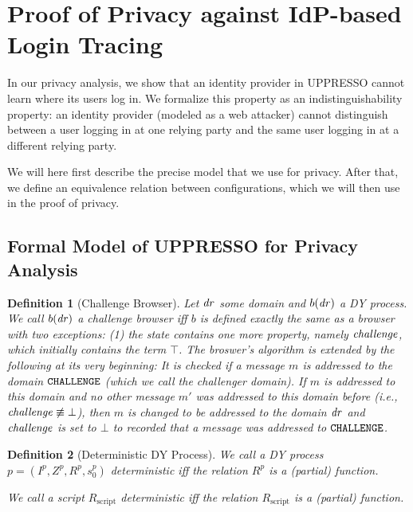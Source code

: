 \documentclass[letterpaper,onecolumn,10pt]{article}
\newtheorem{definition}{Definition}
\begin{document}
\section{Proof of Privacy against IdP-based Login Tracing}

In our privacy analysis, we show that an identity provider in UPPRESSO cannot learn 
where its users log in. We formalize this property as an indistinguishability 
property: an identity provider (modeled as a web attacker) cannot distinguish 
between a user logging in at one relying party and the same user logging in at 
a different relying party.

We will here first describe the precise model that we use for privacy.
After that, we define an equivalence relation between configurations,
which we will then use in the proof of privacy.

\subsection{Formal Model of UPPRESSO for Privacy Analysis}

\begin{definition}[Challenge Browser]
  Let $\mathit{dr}$ some domain and $b(\mathit{dr})$ a DY process. We call $b(\mathit{dr})$ a \emph{challenge browser} iff $b$
  is defined exactly the same as a browser with two exceptions: (1) the
  state contains one more property, namely $\mathit{challenge}$, which  initially 
  contains the term $\top$. The broswer's algorithm is extended by the following 
  at its very beginning: It is checked if a message $m$ is addressed to the domain
  $\mathtt{CHALLENGE}$ (which we call the challenger domain). If $m$ is
  addressed to this domain and no other message $m'$ was addressed to
  this domain before (i.e., $\mathit{challenge} \not\equiv \bot$), then
  $m$ is changed to be addressed to the domain $\mathit{dr}$ and $\mathit{challenge}$ is 
  set to $\bot$ to recorded that a message was addressed to $\mathtt{CHALLENGE}$.
\end{definition}

\begin{definition}[Deterministic DY Process]
  We call a DY process $p = (I^p,Z^p,R^p,s_0^p)$ \emph{deterministic} iff 
  the relation $R^p$ is a (partial) function.

  We call a script $R_\text{script}$ \emph{deterministic} iff the relation 
  $R_\text{script}$ is a (partial) function.
\end{definition}
\end{document}
